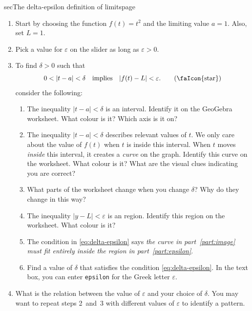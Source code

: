 \documentclass[../main.tex]{subfiles}
\begin{document}
\begin{outline}{sec}{The delta-epsilon definition of limits}{page}
\begin{enumerate}
    \item Start by choosing the function \(f(t) = t^{2}\) and the limiting value \(a = 1\). Also, set \(L = 1\).
    \item Pick a value for \(\varepsilon\) on the slider  as long as \(\varepsilon > 0\).
    \item \label{part:delta} To find \(\delta > 0\) such that
          \begin{equation} \label{eq:delta-epsilon}
            0 < |t - a| < \delta \quad\text{implies} \quad |f(t) - L| < \varepsilon. \tag{\faIcon{star}}
          \end{equation}
          consider the following:
          \begin{enumerate}
            \item The inequality \(|t - a| < \delta\) is an interval. Identify it on the GeoGebra worksheet. What colour is it? Which axis is it on?
            \item \label{part:image} The inequality \(|t - a| < \delta\) describes relevant values of \(t\).  We only care about the value of \(f(t)\) when \(t\) is inside this interval. When \(t\) moves \emph{inside} this interval, it creates a \emph{curve} on the graph.  Identify this curve on the worksheet. What colour is it? What are the visual clues indicating you are correct?
            \item What parts of the worksheet change when you change \(\delta\)?  Why do they change in this way?
            \item \label{part:epsilon} The inequality \(|y - L| < \varepsilon\) is an region. Identify this region on the worksheet. What colour is it?
            \item The condition in \eqref{eq:delta-epsilon} says \emph{the curve in part~\eqref{part:image} must fit entirely inside the region in part~\eqref{part:epsilon}}.
            \item Find a value of \(\delta\) that satisfies the condition \eqref{eq:delta-epsilon}.  In the text box, you can enter \texttt{epsilon} for the Greek letter \(\varepsilon\).
          \end{enumerate}
    \item \label{part:observe} What is the relation between the value of \(\varepsilon\) and your choice of \(\delta\).  You may want to repeat steps 2~and~3 with different values of \(\varepsilon\) to identify a pattern.

\end{enumerate}
\end{outline}
\end{document}
